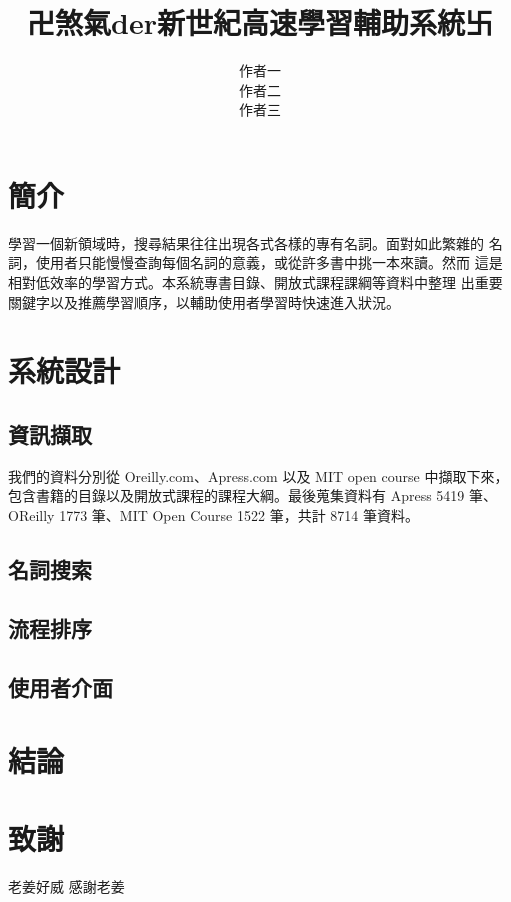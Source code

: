 \documentclass[twocolumn]{article}
\begin{document}
\title{卍煞氣der新世紀高速學習輔助系統卐}

\author{
\alignauthor 作者一 \\
\alignauthor 作者二 \\
\alignauthor 作者三\\
\and
}
\date{}
\maketitle
\thispagestyle{empty}

\section{簡介}
學習一個新領域時，搜尋結果往往出現各式各樣的專有名詞。面對如此繁雜的
名詞，使用者只能慢慢查詢每個名詞的意義，或從許多書中挑一本來讀。然而
這是相對低效率的學習方式。本系統專書目錄、開放式課程課綱等資料中整理
出重要關鍵字以及推薦學習順序，以輔助使用者學習時快速進入狀況。

\section{系統設計}


\subsection{資訊擷取}
我們的資料分別從 Oreilly.com、Apress.com 以及 MIT open course 中擷取下來，
包含書籍的目錄以及開放式課程的課程大綱。最後蒐集資料有 Apress 5419 筆、
OReilly 1773 筆、MIT Open Course 1522 筆，共計 8714 筆資料。

\subsection{名詞搜索}


\subsection{流程排序}


\subsection{使用者介面}


\section{結論}

\section{致謝}
老姜好威 感謝老姜
\end{document}
